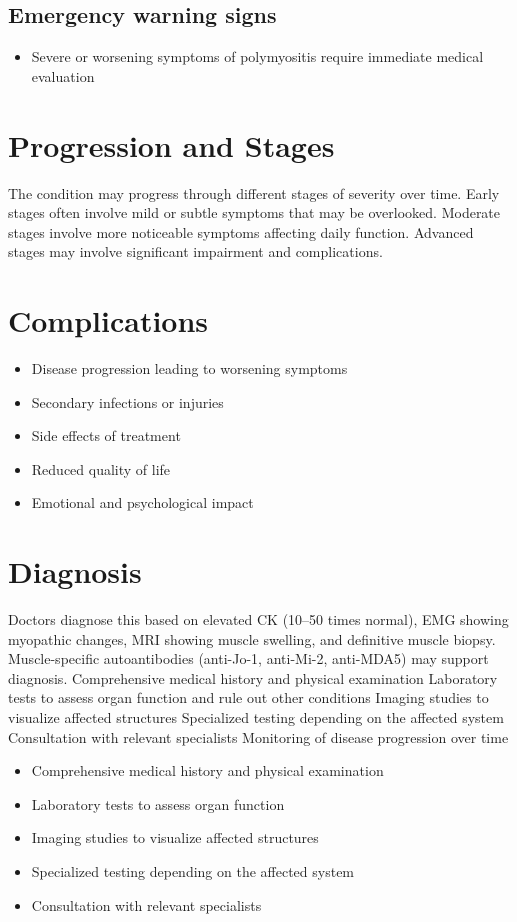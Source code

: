 \subsection{Emergency warning signs}
\begin{itemize}[noitemsep]
  \item Severe or worsening symptoms of polymyositis require immediate medical evaluation
\end{itemize}
\section{Progression and Stages}
The condition may progress through different stages of severity over time. Early stages often involve mild or subtle symptoms that may be overlooked. Moderate stages involve more noticeable symptoms affecting daily function. Advanced stages may involve significant impairment and complications.
\section{Complications}
\begin{itemize}[noitemsep]
  \item Disease progression leading to worsening symptoms
  \item Secondary infections or injuries
  \item Side effects of treatment
  \item Reduced quality of life
  \item Emotional and psychological impact
\end{itemize}
\section{Diagnosis}
Doctors diagnose this based on elevated CK (10--50 times normal), EMG showing myopathic changes, MRI showing muscle swelling, and definitive muscle biopsy. Muscle-specific autoantibodies (anti-Jo-1, anti-Mi-2, anti-MDA5) may support diagnosis. Comprehensive medical history and physical examination Laboratory tests to assess organ function and rule out other conditions Imaging studies to visualize affected structures Specialized testing depending on the affected system Consultation with relevant specialists Monitoring of disease progression over time

\begin{itemize}[noitemsep]
  \item Comprehensive medical history and physical examination
  \item Laboratory tests to assess organ function
  \item Imaging studies to visualize affected structures
  \item Specialized testing depending on the affected system
  \item Consultation with relevant specialists
\end{itemize}
